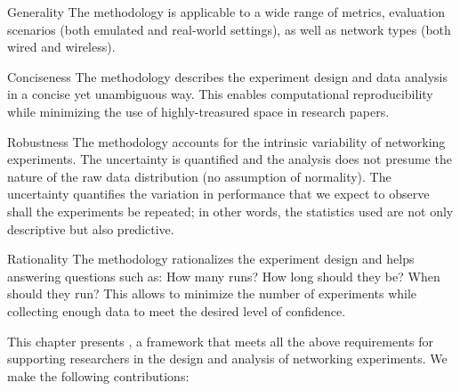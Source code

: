 \begin{features}

	\item[Generality]
	The methodology is applicable to a wide range of metrics, evaluation scenarios (both emulated and real-world settings), as well as network types (both wired and wireless).

	\item[Conciseness]
	The methodology describes the experiment design and data analysis in a concise yet unambiguous way.
	This enables computational reproducibility while \mbox{minimizing} the use of highly-treasured space in research papers.

	\item[Robustness]
	The methodology accounts for the intrinsic variability of networking experiments.
	The uncertainty is quantified and the analysis does not presume the nature of the raw data distribution (\eg no assumption of normality).
	The uncertainty quantifies the variation in performance that we expect to observe shall the experiments be repeated; in other words, the statistics used are not only descriptive but also predictive.

	\item[Rationality]
	The methodology rationalizes the experiment design and helps answering questions such as: How many runs? How long should they be? When should they run?
	This allows to minimize the number of experiments while collecting enough data to meet the desired level of confidence.

\end{features}

This chapter presents \triscale, a framework that meets all the above requirements for supporting researchers in the design and analysis of networking experiments.
We make the following contributions:

